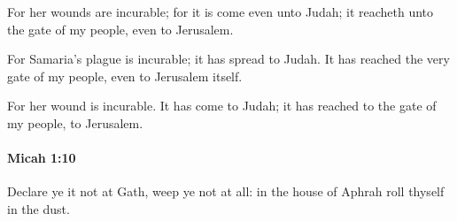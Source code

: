 			\begin{versebox}
					\item[BHS] 
					\item[LXX] 
					\item[ASV] For her wounds are incurable; for it is come even unto Judah; it reacheth unto the gate of my people, even to Jerusalem.
					\item[NIV] For Samaria’s plague is incurable; it has spread to Judah. It has reached the very gate of my people, even to Jerusalem itself.
					\item[NRSV] For her wound is incurable. It has come to Judah; it has reached to the gate of my people, to Jerusalem.
			\end{versebox}

		\paragraph{Micah 1:10} %
			\label{MICAH-1-10}

			Declare ye it not at Gath, weep ye not at all: in the house of Aphrah roll thyself in the dust.

